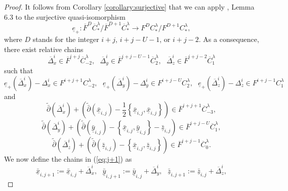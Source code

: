 \documentclass[a4paper]{article}
\numberwithin{equation}{section}
\begin{document}
\begin{proof}
It follows from Corollary \ref{corollary:surjective} that we can apply \cite{ki2}, Lemma 6.3 to the surjective quasi-isomorphism
\begin{equation}
\underline{e}_+:\overline{F}^D\overline{C}_\ast^\lambda/\overline{F}^{D+1}\overline{C}_\ast^\lambda\rightarrow F^DC_\ast^\lambda/F^{D+1}C_\ast^\lambda,
\end{equation}
where $D$ stands for the integer $i+j$, $i+j-U-1$, or $i+j-2$. As a consequence, there exist relative chains
\begin{equation}\label{eq:rc}
\overline{\Delta}_x^i\in\overline{F}^{i+j}\overline{C}_{-2}^\lambda,\textrm{ }\overline{\Delta}_y^i\in\overline{F}^{i+j-U-1}\overline{C}_2^\lambda,\textrm{ }\overline{\Delta}_z^i\in\overline{F}^{i+j-2}\overline{C}_1^\lambda
\end{equation}
such that
\begin{equation}\label{eq:diff}
\underline{e}_+(\overline{\Delta}_x^i)-\Delta_x^i\in F^{i+j+1}C_{-2}^\lambda,\textrm{ }\underline{e}_+(\overline{\Delta}_y^i)-\Delta_y^i\in F^{i+j-U}C_2^\lambda,\textrm{ }\underline{e}_+(\overline{\Delta}_z^i)-\Delta_z^i\in F^{i+j-1}C_1^\lambda
\end{equation}
and
\begin{equation}
\tilde{\bar{\partial}}(\overline{\Delta}_x^i)+\left(\tilde{\bar{\partial}}(\bar{\underline{x}}_{i,j})-\frac{1}{2}\left\{\bar{\underline{x}}_{i,j},\bar{\underline{x}}_{i,j}\right\}\right)\in\overline{F}^{i+j+1}\overline{C}_{-3}^\lambda,
\end{equation}
\begin{equation}
\tilde{\bar{\partial}}(\overline{\Delta}_y^i)+\left(\tilde{\bar{\partial}}(\bar{\underline{y}}_{i,j})-\left\{\bar{\underline{x}}_{i,j},\bar{\underline{y}}_{i,j}\right\}-\bar{\underline{z}}_{i,j}\right)\in\overline{F}^{i+j-U}\overline{C}_1^\lambda,
\end{equation}
\begin{equation}
\tilde{\bar{\partial}}(\overline{\Delta}_z^i)+\left(\tilde{\bar{\partial}}(\bar{\underline{z}}_{i,j})-\left\{\bar{\underline{x}}_{i,j},\bar{\underline{z}}_{i,j}\right\}\right)\in\overline{F}^{i+j-1}\overline{C}_0^\lambda.
\end{equation}
We now define the chains in (\ref{eq:j+1}) as
\begin{equation}
\bar{\underline{x}}_{i,j+1}:=\bar{\underline{x}}_{i,j}+\overline{\Delta}_x^i,\textrm{ }\bar{\underline{y}}_{i,j+1}:=\bar{\underline{y}}_{i,j}+\overline{\Delta}_y^i,\textrm{ }\bar{\underline{z}}_{i,j+1}:=\bar{\underline{z}}_{i,j}+\overline{\Delta}_z^i,

\end{equation}
\end{proof}
\end{document}
